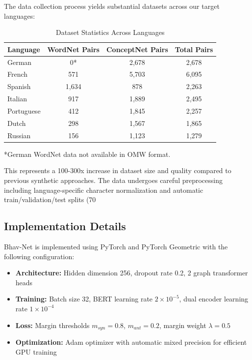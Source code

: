 \documentclass[11pt]{article}
\begin{document}
The data collection process yields substantial datasets across our target languages:

\begin{table}[htbp]
\caption{Dataset Statistics Across Languages}
\begin{center}
\begin{tabular}{|l|c|c|c|}
\hline
\textbf{Language} & \textbf{WordNet Pairs} & \textbf{ConceptNet Pairs} & \textbf{Total Pairs} \\
\hline
German & 0* & 2,678 & 2,678 \\
\hline
French & 571 & 5,703 & 6,095 \\
\hline
Spanish & 1,634 & 878 & 2,263 \\
\hline
Italian & 917 & 1,889 & 2,495 \\
\hline
Portuguese & 412 & 1,845 & 2,257 \\
\hline
Dutch & 298 & 1,567 & 1,865 \\
\hline
Russian & 156 & 1,123 & 1,279 \\
\hline
\end{tabular}
\label{tab:dataset_stats}
\end{center}
\end{table}

*German WordNet data not available in OMW format.

This represents a 100-300x increase in dataset size and quality compared to previous synthetic approaches. The data undergoes careful preprocessing including language-specific character normalization and automatic train/validation/test splits (70%

\subsection{Implementation Details}

Bhav-Net is implemented using PyTorch and PyTorch Geometric with the following configuration:

\begin{itemize}
\item \textbf{Architecture:} Hidden dimension 256, dropout rate 0.2, 2 graph transformer heads
\item \textbf{Training:} Batch size 32, BERT learning rate $2 \times 10^{-5}$, dual encoder learning rate $1 \times 10^{-4}$
\item \textbf{Loss:} Margin thresholds $m_{syn} = 0.8$, $m_{ant} = 0.2$, margin weight $\lambda = 0.5$
\item \textbf{Optimization:} Adam optimizer with automatic mixed precision for efficient GPU training
\end{itemize}
\end{document}
